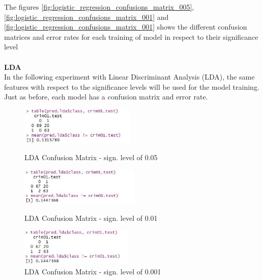The figures \ref{fig:logistic_regression_confusions_matrix_005}, \ref{fig:logistic_regression_confusions_matrix_001} and \ref{fig:logistic_regression_confusions_matrix_001} shows the different confusion matrices and error rates for each training of model in respect to their significance level\\

\\
\noindent
\textbf{LDA} \\
In the following experiment with Linear Discriminant Analysis (LDA), the same features with respect to the significance levels will be used for the model training. Just as before, each model has a confusion matrix and error rate.  

 



\begin{figure}[H]
\centering
\begin{minipage}{0.32\textwidth}
\centering
    \includegraphics[width=\linewidth, height=50pt]{Graphics/Assignment1/LDAConfusionsMatrix_005.JPG}
    \caption{LDA Confusion Matrix - sign. level of 0.05}
    \label{fig:LDA_005}
\end{minipage}\hfill
\begin{minipage}{0.32\textwidth}
\centering

\includegraphics[width=\linewidth, height= 50pt]{Graphics/Assignment1/LDAConfusionsMatrix_001.JPG}
    \caption{LDA Confusion Matrix - sign. level of 0.01}
    \label{fig:LDA_001}
\end{minipage}\hfill
\begin{minipage}{0.32\textwidth}
\centering

\includegraphics[width=\linewidth, height= 50pt]{Graphics/Assignment1/LDAConfusionsMatrix_0001.JPG}
    \caption{LDA Confusion Matrix - sign. level of 0.001}
    \label{fig:LDA_0001}
\end{minipage}
\end{figure}


